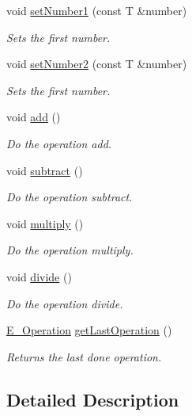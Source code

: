 \begin{DoxyCompactItemize}
void \mbox{\hyperlink{class_calculation_a915d1db1cf80900f7a57af981a5f275a}{set\+Number1}} (const T \&number)
\begin{DoxyCompactList}\small\item\em Sets the first number. \end{DoxyCompactList}\item 
void \mbox{\hyperlink{class_calculation_a68b771f19c2f08ca95ca819dd848739f}{set\+Number2}} (const T \&number)
\begin{DoxyCompactList}\small\item\em Sets the first number. \end{DoxyCompactList}\item 
void \mbox{\hyperlink{class_calculation_ab55212dfa6fb55cee8ab258a8f7472a1}{add}} ()
\begin{DoxyCompactList}\small\item\em Do the operation add. \end{DoxyCompactList}\item 
void \mbox{\hyperlink{class_calculation_ad62e9335854e29e493f78e1717af2a22}{subtract}} ()
\begin{DoxyCompactList}\small\item\em Do the operation subtract. \end{DoxyCompactList}\item 
void \mbox{\hyperlink{class_calculation_ad83eb07a25a6ed6c5d09160a4ed0fb5c}{multiply}} ()
\begin{DoxyCompactList}\small\item\em Do the operation multiply. \end{DoxyCompactList}\item 
void \mbox{\hyperlink{class_calculation_aa03d1f9cd24ff9bf03a42847a7d0a67a}{divide}} ()
\begin{DoxyCompactList}\small\item\em Do the operation divide. \end{DoxyCompactList}\item 
\mbox{\hyperlink{_calculation_8h_a57e7c508a7a8b39e59743eb5a00b2ef7}{E\+\_\+\+Operation}} \mbox{\hyperlink{class_calculation_a86e902aafc4c73dbd8a4fa637ef92f57}{get\+Last\+Operation}} ()
\begin{DoxyCompactList}\small\item\em Returns the last done operation. \end{DoxyCompactList}\end{DoxyCompactItemize}


\subsection{Detailed Description}

